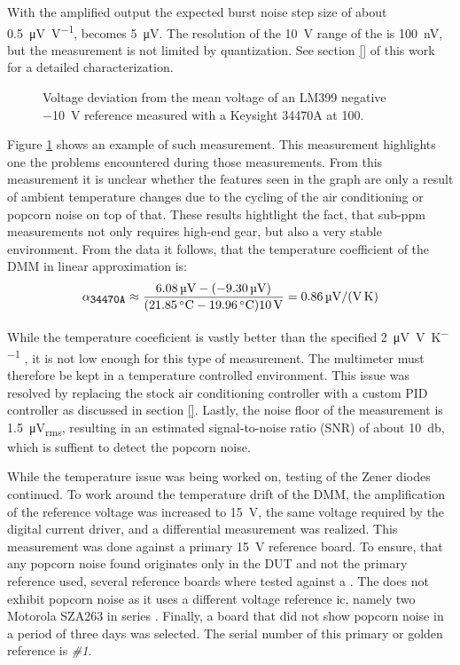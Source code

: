 With the amplified output the expected burst noise step size of about \qty[per-mode=symbol]{0.5}{\micro\volt \per \volt}, becomes \qty{5}{\micro\volt}. The resolution of the \qty{10}{\volt} range of the  is \qty{100}{\nano \volt}, but the measurement is not limited by quantization. See section \ref{} of this work for a detailed characterization.

\begin{figure}[ht]
    \centering
    
    \caption{Voltage deviation from the mean voltage of an LM399 negative \qty{-10}{\volt} reference measured with a Keysight 34470A at \qty{100}{\plc}.}
    \label{fig:lm399_vs_34470a}
\end{figure}

Figure \ref{fig:lm399_vs_34470a} shows an example of such measurement. This measurement highlights one the problems encountered during those measurements. From this measurement it is unclear whether the features seen in the graph are only a result of ambient temperature changes due to the cycling of the air conditioning or popcorn noise on top of that. These results hightlight the fact, that sub-\unit{ppm} measurements not only requires high-end gear, but also a very stable environment. From the data it follows, that the temperature coefficient of the DMM in linear approximation is:
\begin{equation}
    \alpha_{\texttt{\small 34470A}} \approx \frac{\qty{6.08}{\micro\volt}-(-\qty{9.30}{\micro\volt})}{(\qty{21.85}{\celsius}-\qty{19.96}{\celsius})\qty{10}{\volt}} = \qty[per-mode=symbol]{0.86}{\micro\volt \per \volt \per \kelvin}
\end{equation}

While the temperature coeeficient is vastly better than the specified \qty[per-mode=symbol]{2}{\micro\volt \per \volt \per \kelvin} \cite{datasheet_keysight34470A}, it is not low enough for this type of measurement. The multimeter must therefore be kept in a temperature controlled environment. This issue was resolved by replacing the stock air conditioning controller with a custom PID controller as discussed in section \ref{}. Lastly, the noise floor of the measurement is \qty{1.5}{\micro\volt_{rms}}, resulting in an estimated signal-to-noise ratio (SNR) of about \qty{10}{\decibel}, which is suffient to detect the popcorn noise.

While the temperature issue was being worked on, testing of the Zener diodes continued. To work around the temperature drift of the DMM, the amplification of the reference voltage was increased to \qty{15}{\volt}, the same voltage required by the digital current driver, and a differential measurement was realized. This measurement was done against a primary \qty{15}{\volt} reference board. To ensure, that any popcorn noise found originates only in the DUT and not the primary reference used, several reference boards where tested against a . The  does not exhibit popcorn noise as it uses a different voltage reference ic, namely two Motorola SZA263 in series \cite{service_manual_fluke_5440b}. Finally, a board that did not show popcorn noise in a period of three days was selected. The serial number of this primary or golden reference is \textit{\#1}.

